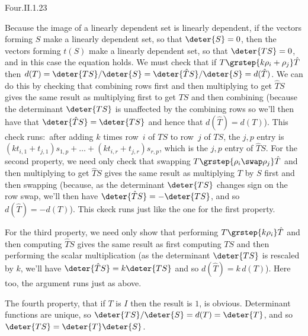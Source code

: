 \begin{ans}{Four.II.1.23}
      \begin{exparts}
        \partsitem Because the image of a linearly dependent set is
          linearly dependent,
          if the vectors forming $S$ make a linearly dependent set,
          so that $\deter{S}=0$,
          then the vectors forming $t(S)$ make a linearly dependent set,
          so that $\deter{TS}=0$, and in this case the equation holds.
        \partsitem We must check that if
          $T\smash[b]{\grstep{k\rho_i+\rho_j}}\hat{T}$ then
          $d(T)=\deter{TS}/\deter{S}=\deter{\hat{T}S}/\deter{S}=d(\hat{T})$.
          We can do this by checking that combining rows first and
          then multiplying to get \( \hat{T}S \) gives the same result as
          multiplying first to get \( TS \) and then combining
          (because the determinant \( \deter{TS} \) is unaffected by the
          combining rows
          so we'll then have that \( \deter{\hat{T}S}=\deter{TS} \) and
          hence that \( d(\hat{T})=d(T) \)).
          This check runs:~after adding
          \( k \) times row~\( i \) of \( TS \) to
          row~$j$ of \( TS \), the \( j,p \) entry is
          \( (kt_{i,1}+t_{j,1})s_{1,p}+\dots+(kt_{i,r}+t_{j,r})s_{r,p} \),
          which is the \( j,p \) entry of \( \hat{T}S \).
        \partsitem For the second property, we need only check that swapping
          $T\smash[b]{\grstep{\rho_i\swap\rho_j}}\hat{T}$
          and then multiplying to get \( \hat{T}S \) gives the same result as
          multiplying \( T \) by \( S \) first and then swapping
          (because,
          as the determinant \( \deter{TS} \) changes sign on
          the row swap, we'll then have \( \deter{\hat{T}S}=-\deter{TS} \),
          and so \( d(\hat{T})=-d(T) \)).
          This ckeck runs just like the one for the first property.

          For the third property, we need only show that performing
          $T\smash[b]{\grstep{k\rho_i}}\hat{T}$
          and then computing \( \hat{T}S \) gives the same result as
          first computing \( TS \) and then performing the scalar
          multiplication
          (as the determinant \( \deter{TS} \) is rescaled by \( k \),
          we'll have \( \deter{\hat{T}S}=k\deter{TS} \) and
          so \( d(\hat{T})=k\,d(T) \)).
          Here too, the argument runs just as above.

          The fourth property, that if $T$ is $I$ then the result is $1$,
          is obvious.
        \partsitem Determinant functions are unique, so
          \( \deter{TS}/\deter{S}=d(T)=\deter{T} \),
          and so $\deter{TS}=\deter{T}\deter{S}$.
      \end{exparts}
    
\end{ans}
